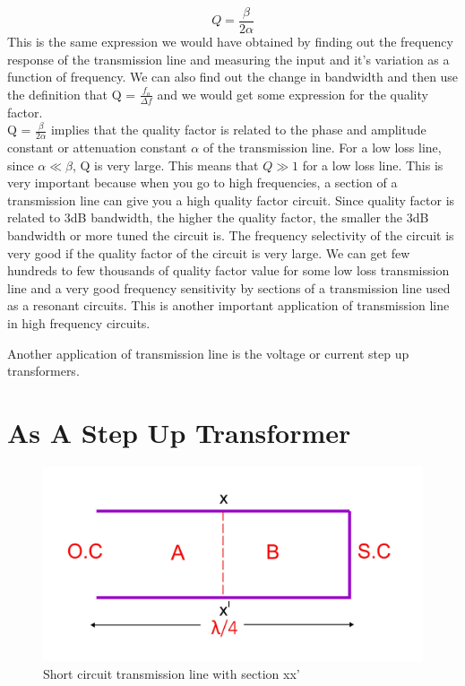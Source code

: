 \begin{equation}
\boxed{ Q = \frac{\beta}{2 \alpha}}
\end{equation}
This is the same expression we would have obtained by finding out the frequency response of the transmission line and measuring  the input and it's variation as a function of frequency. We can also find out the change in bandwidth and then use the definition that Q = $\frac{f_{o}}{\Delta f}$ and we would get some expression for the quality factor.\\ Q = $ \frac{\beta}{2\alpha}$ implies that the quality factor is related to the phase and amplitude constant or attenuation constant $ \alpha$ of the transmission line. For a low loss line, since $ \alpha \ll \beta$, Q is very large. This means that $Q \gg 1$ for a low loss line. This is very important because when you go to high frequencies, a section of a transmission line can give you a high quality factor circuit. Since quality factor is related to 3dB bandwidth, the higher the quality factor, the smaller the 3dB bandwidth or more tuned the circuit is. The frequency selectivity of the circuit is very good if the quality factor of the circuit is very large. We can get few hundreds to few thousands of quality factor value for some low loss transmission line and a very good frequency sensitivity by sections of a transmission line used as a resonant circuits. This is another important application of transmission line in high frequency circuits.

Another application of transmission line is the voltage or current step up transformers. 
\section{As A Step Up Transformer}
\begin{figure}[h]
\centering
\includegraphics[width=1\linewidth]{./graphics/fig5}
\caption{Short circuit transmission line with section xx'}
\end{figure}

